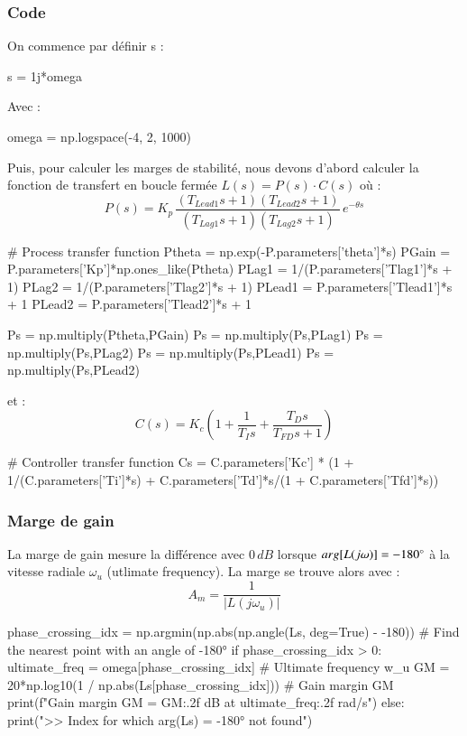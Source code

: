 \subsubsection{Code}
On commence par définir s : 
\begin{python*}
    s = 1j*omega
\end{python*}
Avec : 
\begin{python*}
    omega = np.logspace(-4, 2, 1000)
\end{python*}
Puis, pour calculer les marges de stabilité, nous devons d'abord calculer la fonction de transfert en boucle fermée $L(s) = P(s)\cdot C(s)$ où :
\begin{equation}
    P(s) = K_p\,\frac{(T_{Lead1}s +1)(T_{Lead2}s +1)}{(T_{Lag1}s +1)(T_{Lag2}s +1)}\,e^{-\theta s}
\end{equation}
\begin{python*}
    # Process transfer function
    Ptheta = np.exp(-P.parameters['theta']*s)
    PGain = P.parameters['Kp']*np.ones_like(Ptheta)
    PLag1 = 1/(P.parameters['Tlag1']*s + 1)
    PLag2 = 1/(P.parameters['Tlag2']*s + 1)
    PLead1 = P.parameters['Tlead1']*s + 1
    PLead2 = P.parameters['Tlead2']*s + 1

    Ps = np.multiply(Ptheta,PGain)
    Ps = np.multiply(Ps,PLag1)
    Ps = np.multiply(Ps,PLag2)
    Ps = np.multiply(Ps,PLead1)
    Ps = np.multiply(Ps,PLead2)
\end{python*}
et :
\begin{equation}\label{eq:Cs}
    C(s)=K_c\left(1+\frac{1}{T_Is}+\frac{T_Ds}{T_{FD}s +1}\right)
\end{equation}
\begin{python*}
    # Controller transfer function
    Cs = C.parameters['Kc'] * (1 + 1/(C.parameters['Ti']*s) + C.parameters['Td']*s/(1 + C.parameters['Tfd']*s))
\end{python*}

\subsubsection{Marge de gain}
La marge de gain mesure la différence avec $0\,dB$ lorsque $arg[L(j\omega)] = -180\degree$ à la vitesse radiale $\omega_u$ (utlimate frequency).
La marge se trouve alors avec :
\[A_m = \frac{1}{|L(j\omega_u)|}\]
\begin{python*}
    phase_crossing_idx = np.argmin(np.abs(np.angle(Ls, deg=True) - -180)) # Find the nearest point with an angle of -180°
    if phase_crossing_idx > 0:
        ultimate_freq = omega[phase_crossing_idx] # Ultimate frequency w_u 
        GM = 20*np.log10(1 / np.abs(Ls[phase_crossing_idx])) # Gain margin GM
        print(f"Gain margin GM = {GM:.2f} dB at {ultimate_freq:.2f} rad/s")
    else:
        print(">> Index for which arg(Ls) = -180° not found")
\end{python*}

